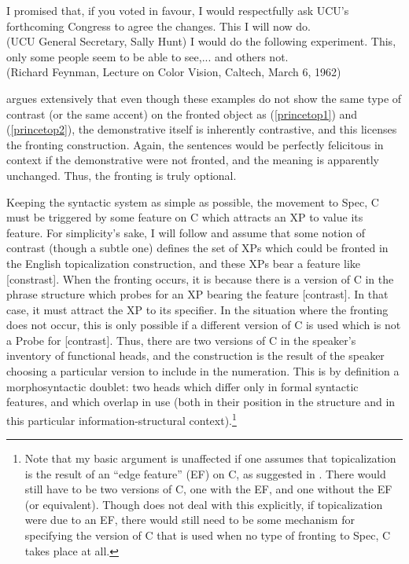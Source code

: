 \begin{exe}
\ex \label{dem1} I promised that, if you voted in favour, I would respectfully ask UCU's forthcoming Congress to agree the changes.
This I will now do.\\
(UCU General Secretary, Sally Hunt)
\ex \label{dem2} I would do the following experiment.
This, only some people seem to be able to see,... and others not.\\
(Richard Feynman, Lecture on Color Vision, Caltech, March 6, 1962)
\end{exe}

\noindent \citet{caitldiss} argues extensively that even though these examples do not show the same type of contrast (or the same accent) on the fronted object as (\ref{princetop1}) and (\ref{princetop2}), the demonstrative itself is inherently contrastive, and this licenses the fronting construction.
Again, the sentences would be perfectly felicitous in context if the demonstrative were not fronted, and the meaning is apparently unchanged.
Thus, the fronting is truly optional.

Keeping the syntactic system as simple as possible, the movement to Spec, C must be triggered by some feature on C which attracts an XP to value its feature.
For simplicity's sake, I will follow \citet{caitldiss} and assume that some notion of contrast (though a subtle one) defines the set of XPs which could be fronted in the English topicalization construction, and these XPs bear a feature like [constrast].
When the fronting occurs, it is because there is a version of C in the phrase structure which probes for an XP bearing the feature [contrast].
In that case, it must attract the XP to its specifier.
In the situation where the fronting does not occur, this is only possible if a different version of C is used which is not a Probe for [contrast].
Thus, there are two versions of C in the speaker's inventory of functional heads, and the construction is the result of the speaker choosing a particular version to include in the numeration.
This is by definition a morphosyntactic doublet: two heads which differ only in formal syntactic features, and which overlap in use (both in their position in the structure and in this particular information-structural context).\footnote{Note that my basic argument is unaffected if one assumes that topicalization is the result of an ``edge feature'' (EF) on C, as suggested in \citet[][151]{chomsky2008}.
There would still have to be two versions of C, one with the EF, and one without the EF (or equivalent).
Though \citet{chomsky2008} does not deal with this explicitly, if topicalization were due to an EF, there would still need to be some mechanism for specifying the version of C that is used when no type of fronting to Spec, C takes place at all.} 

